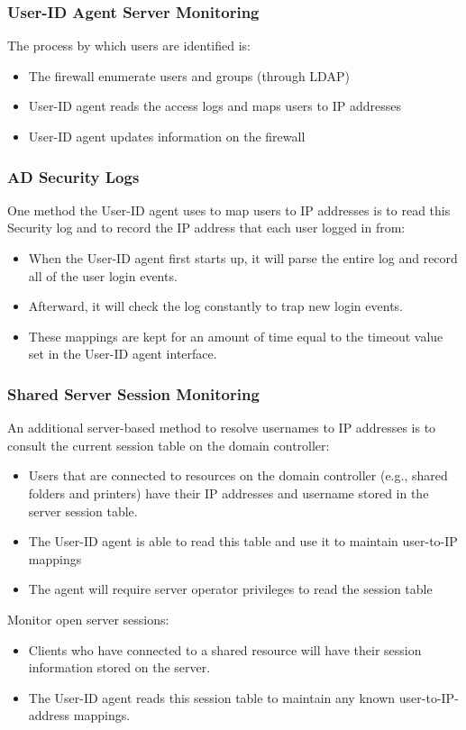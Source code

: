 \subsubsection{User-ID Agent Server Monitoring}
The process by which users are identified is:
\begin{itemize}
    \item The firewall enumerate users and groups (through LDAP)
    \item User-ID agent reads the access logs and maps users to IP addresses
    \item User-ID agent updates information on the firewall
\end{itemize}

\subsubsection{AD Security Logs}
One method the User-ID agent uses to map users to IP addresses is to read this Security log and to record the IP address that each user logged in from:
\begin{itemize}
    \item When the User-ID agent first starts up, it will parse the entire log and record all of the user login events.
    \item Afterward, it will check the log constantly to trap new login events.
    \item These mappings are kept for an amount of time equal to the timeout value set in the User-ID agent interface.
\end{itemize}

\subsubsection{Shared Server Session Monitoring}
An additional server-based method to resolve usernames to IP addresses is to consult the current session table on the domain controller:
\begin{itemize}
    \item Users that are connected to resources on the domain controller (e.g., shared folders and printers) have their IP addresses and username stored in the server session table.
    \item The User-ID agent is able to read this table and use it to maintain user-to-IP mappings
    \item The agent will require server operator privileges to read the session table
\end{itemize}
Monitor open server sessions:
\begin{itemize}
    \item Clients who have connected to a shared resource will have their session information stored on the server.
    \item The User-ID agent reads this session table to maintain any known user-to-IP-address mappings.
\end{itemize}

